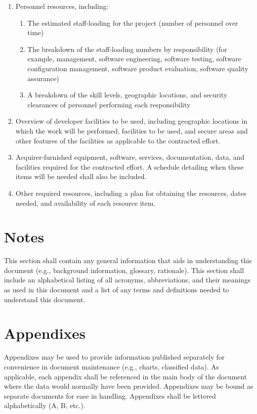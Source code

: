 \documentclass{fidata-report-template}
\begin{document}
\begin{enumerate}
\itemsep1pt\parskip0pt
\item
  Personnel resources, including:

  \begin{enumerate}
  \itemsep1pt\parskip0pt
  \item
    The estimated staff-loading for the project (number of personnel
    over time)
  \item
    The breakdown of the staff-loading numbers by responsibility (for
    example, management, software engineering, software testing,
    software configuration management, software product evaluation,
    software quality assurance)
  \item
    A breakdown of the skill levels, geographic locations, and security
    clearances of personnel performing each responsibility
  \end{enumerate}
\item
  Overview of developer facilities to be used, including geographic
  locations in which the work will be performed, facilities to be used,
  and secure areas and other features of the facilities as applicable to
  the contracted effort.
\item
  Acquirer-furnished equipment, software, services, documentation, data,
  and facilities required for the contracted effort. A schedule
  detailing when these items will be needed shall also be included.
\item
  Other required resources, including a plan for obtaining the
  resources, dates needed, and availability of each resource item.
\end{enumerate}

\section{Notes}

This section shall contain any general information that aids in
understanding this document (e.g., background information, glossary,
rationale). This section shall include an alphabetical listing of all
acronyms, abbreviations, and their meanings as used in this document and
a list of any terms and definitions needed to understand this document.

\appendix

\section{Appendixes}

Appendixes may be used to provide information published separately for
convenience in document maintenance (e.g., charts, classified data). As
applicable, each appendix shall be referenced in the main body of the
document where the data would normally have been provided. Appendixes
may be bound as separate documents for ease in handling. Appendixes
shall be lettered alphabetically (A, B, etc.).
\end{document}

